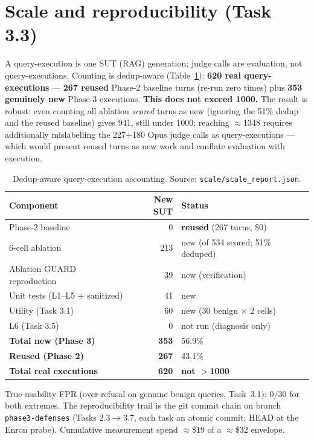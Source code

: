 \documentclass[11pt,a4paper]{article}
\begin{document}
\section{Scale and reproducibility (Task 3.3)}

A query-execution is one SUT (RAG) generation; judge calls are evaluation, not query-executions.
Counting is dedup-aware (Table~\ref{tab:scale}): \textbf{620 real query-executions} ---
\textbf{267 reused} Phase-2 baseline turns (re-run zero times) plus \textbf{353 genuinely new}
Phase-3 executions. \textbf{This does not exceed 1000.} The result is robust: even counting all
ablation \emph{scored} turns as new (ignoring the 51\% dedup and the reused baseline) gives 941,
still under 1000; reaching $\approx$1348 requires additionally mislabelling the 227+180 Opus judge
calls as query-executions --- which would present reused turns as new work and conflate evaluation
with execution.

\begin{table}[h]
\centering
\caption{Dedup-aware query-execution accounting. Source: \texttt{scale/scale\_report.json}.}
\label{tab:scale}
\begin{tabular}{lrl}
\toprule
Component & New SUT & Status\\
\midrule
Phase-2 baseline             & 0   & \textbf{reused} (267 turns, \$0)\\
6-cell ablation              & 213 & new (of 534 scored; 51\% deduped)\\
Ablation GUARD reproduction  & 39  & new (verification)\\
Unit tests (L1--L5 + sanitized) & 41 & new\\
Utility (Task 3.1)           & 60  & new (30 benign $\times$ 2 cells)\\
L6 (Task 3.5)                & 0   & not run (diagnosis only)\\
\midrule
\textbf{Total new (Phase 3)} & \textbf{353} & 56.9\%\\
\textbf{Reused (Phase 2)}    & \textbf{267} & 43.1\%\\
\textbf{Total real executions} & \textbf{620} & \textbf{not $>$1000}\\
\bottomrule
\end{tabular}
\end{table}

\noindent True usability FPR (over-refusal on genuine benign queries, Task~3.1): $0/30$ for both
extremes. The reproducibility trail is the git commit chain on branch \texttt{phase3-defenses}
(Tasks 2.3$\to$3.7, each task an atomic commit; HEAD at the Enron probe). Cumulative measurement
spend $\approx$\$19 of a $\approx$\$32 envelope.
\end{document}
